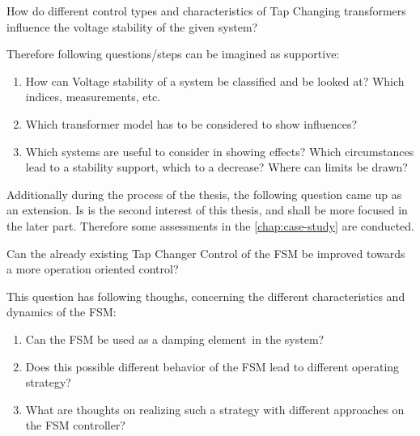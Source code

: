 \begin{tcolorbox}[float, colback=ees_blue!5!white,colframe=ees_blue, toptitle=1mm, bottomtitle=1mm, left=2mm, right=2.5mm, top=2mm, bottom=2mm, title={\textbf{Research Question of this Thesis}}]
    How do different control types and characteristics of Tap Changing transformers influence the voltage stability of the given system?
\end{tcolorbox}

Therefore following questions/steps can be imagined as supportive:
\begin{enumerate}
    \item How can Voltage stability of a system be classified and be looked at? Which indices, measurements, etc.
    \item Which transformer model has to be considered to show influences?
    \item Which systems are useful to consider in showing effects? Which circumstances lead to a stability support, which to a decrease? Where can limits be drawn?
\end{enumerate}

Additionally during the process of the thesis, the following question came up as an extension.
Is is the second interest of this thesis, and shall be more focused in the later part.
Therefore some assessments in the \autoref{chap:case-study} are conducted.

\begin{tcolorbox}[float, colback=ees_green!5!white,colframe=ees_green, toptitle=1mm, bottomtitle=1mm, left=2mm, right=2.5mm, top=2mm, bottom=2mm, title={\textbf{Additional Question of this Thesis}}]
    Can the already existing Tap Changer Control of the \acf{FSM} be improved towards a more operation oriented control?
\end{tcolorbox}

This question has following thoughs, concerning the different characteristics and dynamics of the \acs{FSM}:
\begin{enumerate}
    \item Can the \acs{FSM} be used as a \glqq damping element\grqq~in the system?
    \item Does this possible different behavior of the \acs{FSM} lead to different operating strategy?
    \item What are thoughts on realizing such a strategy with different approaches on the \acs{FSM} controller?
\end{enumerate}

